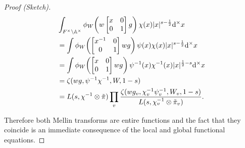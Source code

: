 \begin{proof}[Proof (Sketch)]
\[
\begin{aligned}
&\int_{F^{\times} \backslash \mathbb{A}^{\times}} \phi_W\!\left(w\begin{bmatrix} x & 0 \\ 0 & 1 \end{bmatrix} g\right) \chi(x) |x|^{s - \frac{1}{2}} \mathrm{d}^{\times} x\\
&= \int \phi_W\!\left(\begin{bmatrix} x^{-1} & 0 \\ 0 & 1 \end{bmatrix} wg\right) \psi(x)\chi(x) |x|^{s - \frac{1}{2}} \mathrm{d}^{\times} x\\
&= \int \phi_W\!\left(\begin{bmatrix} x & 0 \\ 0 & 1 \end{bmatrix} wg\right) \psi^{-1}(x)\chi^{-1}(x) |x|^{\frac{1}{2} - s} \mathrm{d}^{\times} x\\
&= \zeta(wg, \psi^{-1}\chi^{-1}, W, 1 - s)\\
&= L(s, \chi^{-1} \otimes \tilde{\pi}) \prod_v \frac{\zeta(wg_v, \chi_v^{-1}\psi_v^{-1}, W_v, 1 - s)}{L(s, \chi_v^{-1} \otimes \tilde{\pi}_v)}.
\end{aligned}
\]

Therefore both Mellin transforms are entire functions and the fact that they coincide is an immediate consequence of the local and global functional equations.

\end{proof}

